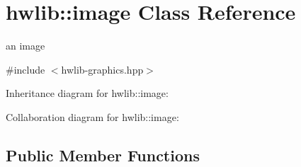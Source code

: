 \hypertarget{classhwlib_1_1image}{}\section{hwlib\+:\+:image Class Reference}
\label{classhwlib_1_1image}


an image  




{\ttfamily \#include $<$hwlib-\/graphics.\+hpp$>$}



Inheritance diagram for hwlib\+:\+:image\+:


Collaboration diagram for hwlib\+:\+:image\+:
\subsection*{Public Member Functions}
